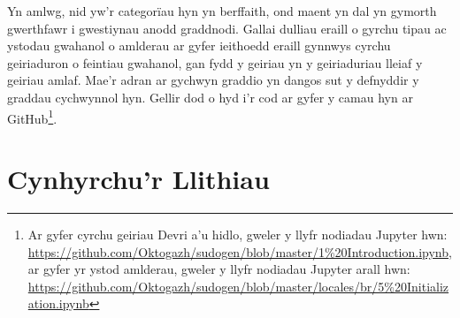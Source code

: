 Yn amlwg, nid yw'r categorïau hyn yn berffaith, ond maent yn dal yn gymorth gwerthfawr i gwestiynau anodd graddnodi. Gallai dulliau eraill o gyrchu tipau ac ystodau gwahanol o amlderau ar gyfer ieithoedd eraill gynnwys cyrchu geiriaduron o feintiau gwahanol, gan fydd y geiriau yn y geiriaduriau lleiaf y geiriau amlaf. Mae'r adran ar gychwyn graddio yn dangos sut y defnyddir y graddau cychwynnol hyn. Gellir dod o hyd i'r cod ar gyfer y camau hyn ar GitHub\footnote{Ar gyfer cyrchu geiriau Devri a'u hidlo, gweler y llyfr nodiadau Jupyter hwn: \url{https://github.com/Oktogazh/sudogen/blob/master/1\%20Introduction.ipynb}, ar gyfer yr ystod amlderau, gweler y llyfr nodiadau Jupyter arall hwn: \url{https://github.com/Oktogazh/sudogen/blob/master/locales/br/5\%20Initialization.ipynb}}.

\section{Cynhyrchu'r Llithiau}
